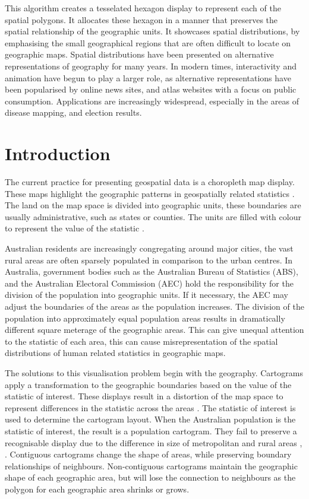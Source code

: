 \documentclass{monashthesis}
\begin{document}
This algorithm creates a tesselated hexagon display to represent each of the spatial polygons. It allocates these hexagon in a manner that preserves the spatial relationship of the geographic units. It showcases spatial distributions, by emphasising the small geographical regions that are often difficult to locate on geographic maps. Spatial distributions have been presented on alternative representations of geography for many years. In modern times, interactivity and animation have begun to play a larger role, as alternative representations have been popularised by online news sites, and atlas websites with a focus on public consumption. Applications are increasingly widespread, especially in the areas of disease mapping, and election results.

\hypertarget{introduction-1}{%
\section{Introduction}\label{introduction-1}}

The current practice for presenting geospatial data is a choropleth map display. These maps highlight the geographic patterns in geospatially related statistics \autocite{SAMGIS}.
The land on the map space is divided into geographic units, these boundaries are usually administrative, such as states or counties. The units are filled with colour to represent the value of the statistic \autocite{EI}.

Australian residents are increasingly congregating around major cities, the vast rural areas are often sparsely populated in comparison to the urban centres.
In Australia, government bodies such as the Australian Bureau of Statistics (ABS), and the Australian Electoral Commission (AEC) hold the responsibility for the division of the population into geographic units. If it necessary, the AEC may adjust the boundaries of the areas as the population increases. The division of the population into approximately equal population areas results in dramatically different square meterage of the geographic areas. This can give unequal attention to the statistic of each area, this can cause misrepresentation of the spatial distributions of human related statistics in geographic maps.

The solutions to this visualisation problem begin with the geography. Cartograms apply a transformation to the geographic boundaries based on the value of the statistic of interest. These displays result in a distortion of the map space to represent differences in the statistic across the areas \autocite{ACCAC}.
The statistic of interest is used to determine the cartogram layout. When the
Australian population is the statistic of interest, the result is a population cartogram. They fail to preserve a recognisable display due to the difference in size of metropolitan and rural areas \autocite{ACTUC}, \autocite{GOINO}.
Contiguous cartograms change the shape of areas, while preserving boundary relationships of neighbours. Non-contiguous cartograms maintain the geographic shape of each geographic area, but will lose the connection to neighbours as the polygon for each geographic area shrinks or grows.
\end{document}
